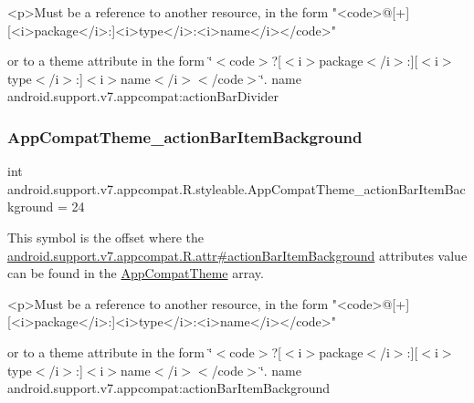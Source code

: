 \begin{DoxyVerb}      <p>Must be a reference to another resource, in the form "<code>@[+][<i>package</i>:]<i>type</i>:<i>name</i></code>"
\end{DoxyVerb}
 or to a theme attribute in the form \char`\"{}$<$code$>$?\mbox{[}$<$i$>$package$<$/i$>$\+:\mbox{]}\mbox{[}$<$i$>$type$<$/i$>$\+:\mbox{]}$<$i$>$name$<$/i$>$$<$/code$>$\char`\"{}.  name android.\+support.\+v7.\+appcompat\+:action\+Bar\+Divider \mbox{\label{classandroid_1_1support_1_1v7_1_1appcompat_1_1R_1_1styleable_a17eecf1a80d73bd2a653d3d4b0c370d3}} 
\subsubsection{\texorpdfstring{App\+Compat\+Theme\+\_\+action\+Bar\+Item\+Background}{AppCompatTheme\_actionBarItemBackground}}
{\footnotesize\ttfamily int android.\+support.\+v7.\+appcompat.\+R.\+styleable.\+App\+Compat\+Theme\+\_\+action\+Bar\+Item\+Background = 24\hspace{0.3cm}{\ttfamily [static]}}

This symbol is the offset where the \hyperlink{classandroid_1_1support_1_1v7_1_1appcompat_1_1R_1_1attr_a5ebb4ad8ffb85e6e340393c3a255ce33}{android.\+support.\+v7.\+appcompat.\+R.\+attr\#action\+Bar\+Item\+Background} attribute\textquotesingle{}s value can be found in the \hyperlink{classandroid_1_1support_1_1v7_1_1appcompat_1_1R_1_1styleable_a5c42f89e8a410c323be34208d75c430b}{App\+Compat\+Theme} array.

\begin{DoxyVerb}      <p>Must be a reference to another resource, in the form "<code>@[+][<i>package</i>:]<i>type</i>:<i>name</i></code>"
\end{DoxyVerb}
 or to a theme attribute in the form \char`\"{}$<$code$>$?\mbox{[}$<$i$>$package$<$/i$>$\+:\mbox{]}\mbox{[}$<$i$>$type$<$/i$>$\+:\mbox{]}$<$i$>$name$<$/i$>$$<$/code$>$\char`\"{}.  name android.\+support.\+v7.\+appcompat\+:action\+Bar\+Item\+Background \mbox{\label{classandroid_1_1support_1_1v7_1_1appcompat_1_1R_1_1styleable_ad1da7806009a3e57f92cf88e4c8ac44a}} 
